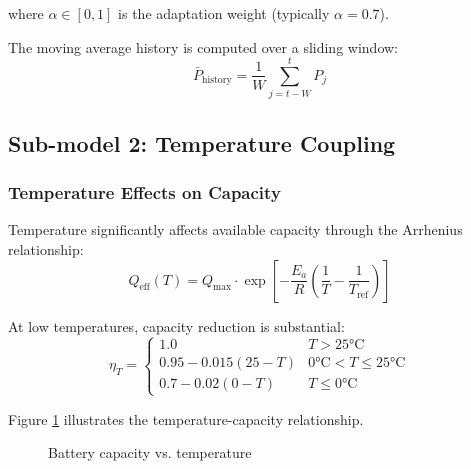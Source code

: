 where $\alpha \in [0,1]$ is the adaptation weight (typically $\alpha = 0.7$).

The moving average history is computed over a sliding window:
\begin{equation}
\bar{P}_{\text{history}} = \frac{1}{W} \sum_{j=t-W}^{t} P_j
\end{equation}

\subsection{Sub-model 2: Temperature Coupling}

\subsubsection{Temperature Effects on Capacity}

Temperature significantly affects available capacity through the Arrhenius relationship:
\begin{equation}
Q_{\text{eff}}(T) = Q_{\max} \cdot \exp\left[-\frac{E_a}{R}\left(\frac{1}{T} - \frac{1}{T_{\text{ref}}}\right)\right]
\label{eq:arrhenius_capacity}
\end{equation}

At low temperatures, capacity reduction is substantial:
\begin{equation}
\eta_T = \begin{cases}
1.0 & T > 25°\text{C} \\
0.95 - 0.015(25-T) & 0°\text{C} < T \leq 25°\text{C} \\
0.7 - 0.02(0-T) & T \leq 0°\text{C}
\end{cases}
\label{eq:temp_efficiency}
\end{equation}

Figure \ref{fig:temp_capacity} illustrates the temperature-capacity relationship.

\begin{figure}[H]
\centering
{}
\caption{Battery capacity vs. temperature}
\label{fig:temp_capacity}
\end{figure}

